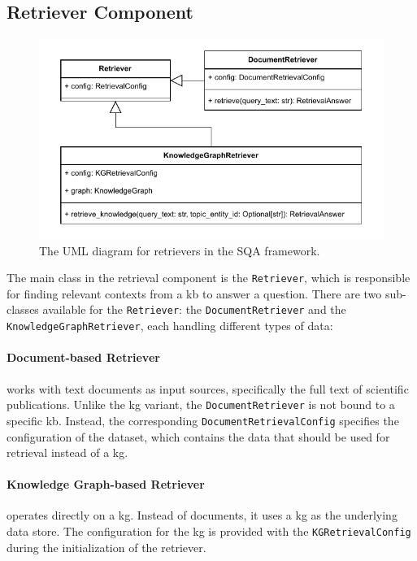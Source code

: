 \subsection{Retriever Component}
\label{sec:sqas_architecture_retriever}

\begin{figure}[t]
    \centering
    \includegraphics[width=0.80\linewidth]{figures/framework/figures-Retriever_UML.drawio.pdf}
    \caption[UML Diagram for Retrievers in the SQA Framework]{The UML diagram for retrievers in the SQA framework.}
    \label{fig:retriever_model}
\end{figure}

The main class in the retrieval component is the \texttt{Retriever}, which is responsible for finding relevant contexts from a \gls{kb} to answer a question. There are two sub-classes available for the \texttt{Retriever}: the \texttt{DocumentRetriever} and the \texttt{KnowledgeGraphRetriever}, each handling different types of data:

\paragraph{Document-based Retriever} works with text documents as input sources, specifically the full text of scientific publications. Unlike the \gls{kg} variant, the \texttt{DocumentRetriever} is not bound to a specific \gls{kb}. Instead, the corresponding \texttt{DocumentRetrievalConfig} specifies the configuration of the dataset, which contains the data that should be used for retrieval instead of a \gls{kg}.

\paragraph{Knowledge Graph-based Retriever} operates directly on a \gls{kg}. Instead of documents, it uses a \gls{kg} as the underlying data store. The configuration for the \gls{kg} is provided with the \texttt{KGRetrievalConfig} during the initialization of the retriever.

